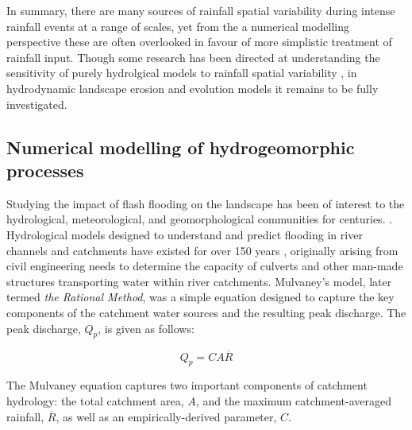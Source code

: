 In summary, there are many sources of rainfall spatial variability during intense rainfall events at a range of scales, yet from the a numerical modelling perspective these are often overlooked in favour of more simplistic treatment of rainfall input. Though some research has been directed at understanding the sensitivity of purely hydrolgical models to rainfall spatial variability \citep{krajewski1991monte,nicotina2008impact,segond2007simulation}, in hydrodynamic landscape erosion and evolution models it remains to be fully investigated.



\subsection{Numerical modelling of hydrogeomorphic processes}

Studying the impact of flash flooding on the landscape has  been of interest to the hydrological, meteorological, and geomorphological communities for centuries. \citep[e.g.][]{dana1882flood,schumm1979geomorphic,Costa1995}. Hydrological models designed to understand and predict flooding in river channels and catchments have existed for over 150 years \citep{mulvaney1851use}, originally arising from civil engineering needs to determine the capacity of culverts and other man-made structures transporting water within river catchments. Mulvaney's model, later termed \textit{the Rational Method}, was a simple equation designed to capture the key components of the catchment water sources and the resulting peak discharge. The peak discharge, \(Q_p\), is given as follows:

\begin{equation}
Q_p = CA\overline{R}
\end{equation}

The Mulvaney equation captures two important components of catchment hydrology: the total catchment area, \(A\), and the maximum catchment-averaged rainfall, \(\overline{R}\), as well as an empirically-derived parameter, \(C\). 

